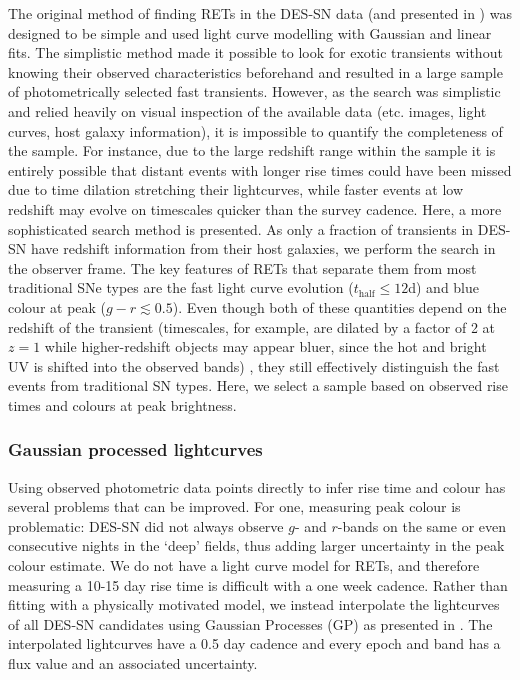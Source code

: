 \documentclass[fleqn,usenatbib,]{mnras}
\newcommand{\replyref}[1]{\color{magenta}#1 \color{black}}
\begin{document}
The original method of finding RETs in the DES-SN data (and presented in ) was designed to be simple and used light curve modelling with Gaussian and linear fits. The simplistic method made it possible to look for exotic transients without knowing their observed characteristics beforehand and resulted in a large sample of photometrically selected fast transients. However, as the search was simplistic and relied heavily on visual inspection of the available data (etc. images, light curves, host galaxy information), it is impossible to quantify the completeness of the sample. For instance, due to the large redshift range within the sample it is entirely possible that distant events with longer rise times could have been missed due to time dilation stretching their lightcurves, while faster events \replyref{at} low redshift may evolve on timescales quicker than the survey cadence. Here, a more sophisticated search method is presented. As only a fraction of transients in DES-SN have redshift information from their host galaxies, we perform the search in the observer frame. The key features of RETs that separate them from most traditional SNe types are the fast light curve evolution \replyref{($t_{\mathrm{half}}\leq12$d)} and blue colour at peak ($g-r \lesssim 0.5$). Even though both of these quantities depend on the redshift of the transient \replyref{(timescales, for example, are dilated by a factor of 2 at $z=1$ while higher-redshift objects may appear bluer, since the hot and bright UV is shifted into the observed bands)}, they still effectively distinguish the fast events from traditional SN types. \replyref{Here, we} select a sample based on observed rise times and colours at peak brightness.

\subsubsection{Gaussian processed lightcurves}
Using observed photometric data points directly to infer rise time and colour has several problems that can be improved. For one, measuring peak colour is problematic: DES-SN did not always observe $g$- and $r$-bands on the same or even consecutive nights in the `deep' fields, thus adding larger uncertainty in the peak colour estimate. We do not have a light curve model for RETs, and therefore measuring a 10-15 day rise time is difficult with a one week cadence. Rather than fitting with a physically motivated model, we instead interpolate the lightcurves of all DES-SN candidates using Gaussian Processes (GP) as presented in \citet{Pursiainen2020}. The interpolated lightcurves have a 0.5 day cadence and every epoch and band has a flux value and an associated uncertainty. 
\end{document}
